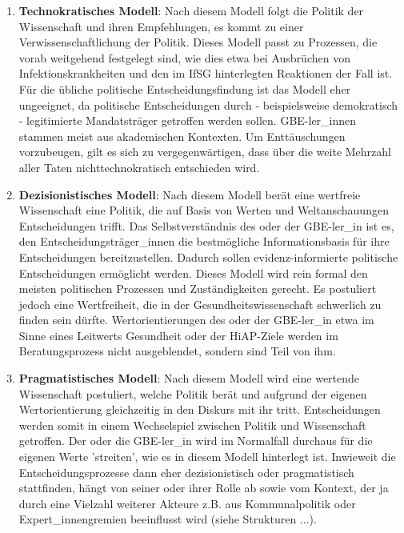 \documentclass{article}
\begin{document}
\begin{enumerate}
\item \textbf{Technokratisches Modell}: Nach diesem Modell folgt die Politik der Wissenschaft und ihren Empfehlungen, es kommt zu einer Verwissenschaftlichung der Politik. Dieses Modell passt zu Prozessen, die vorab weitgehend festgelegt sind, wie dies etwa bei Ausbrüchen von Infektionskrankheiten und den im IfSG hinterlegten Reaktionen der Fall ist. Für die übliche politische Entscheidungsfindung ist das Modell eher ungeeignet, da politische Entscheidungen durch - beispielsweise demokratisch - legitimierte Mandatsträger getroffen werden sollen. GBE-ler\_innen stammen meist aus akademischen Kontexten. Um Enttäuschungen vorzubeugen, gilt es sich zu vergegenwärtigen, dass über die weite Mehrzahl aller Taten nichttechnokratisch entschieden wird.


\item \textbf{Dezisionistisches Modell}: Nach diesem Modell berät eine wertfreie Wissenschaft eine Politik, die auf Basis von Werten und Weltanschauungen Entscheidungen trifft. Das Selbstverständnis des oder der GBE-ler\_in ist es, den Entscheidungsträger\_innen die bestmögliche Informationsbasis für ihre Entscheidungen bereitzustellen. Dadurch sollen evidenz-informierte politische Entscheidungen ermöglicht werden\autocite{Rushmerundweitere2019}. Dieses Modell wird rein formal den meisten politischen Prozessen und Zuständigkeiten gerecht. Es postuliert jedoch eine Wertfreiheit, die in der Gesundheitswissenschaft schwerlich zu finden sein dürfte. Wertorientierungen des oder der GBE-ler\_in etwa im Sinne eines Leitwerts Gesundheit oder der HiAP-Ziele werden im Beratungsprozess nicht ausgeblendet, sondern sind Teil von ihm. 


\item \textbf{Pragmatistisches Modell}: Nach diesem Modell wird eine wertende Wissenschaft postuliert, welche Politik berät und aufgrund der eigenen Wertorientierung gleichzeitig in den Diskurs mit ihr tritt. Entscheidungen werden somit in einem Wechselspiel zwischen Politik und Wissenschaft getroffen. Der oder die GBE-ler\_in wird im Normalfall durchaus für die eigenen Werte 'streiten', wie es in diesem Modell hinterlegt ist. Inwieweit die Entscheidungsprozesse dann eher dezisionistisch oder pragmatistisch stattfinden, hängt von seiner oder ihrer Rolle ab sowie vom Kontext, der ja durch eine Vielzahl weiterer Akteure z.B. aus Kommunalpolitik oder Expert\_innengremien beeinflusst wird (siehe Strukturen ...).


\end{enumerate}
\end{document}
